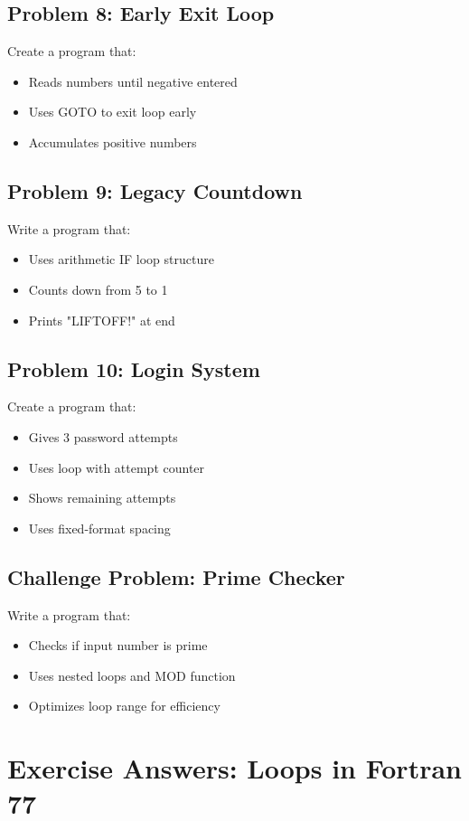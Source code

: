 \documentclass{book}
\begin{document}
\subsection*{Problem 8: Early Exit Loop}  
Create a program that:  
\begin{itemize}  
\item Reads numbers until negative entered  
\item Uses GOTO to exit loop early  
\item Accumulates positive numbers  
\end{itemize}

\subsection*{Problem 9: Legacy Countdown}  
Write a program that:  
\begin{itemize}  
\item Uses arithmetic IF loop structure  
\item Counts down from 5 to 1  
\item Prints "LIFTOFF!" at end  
\end{itemize}

\subsection*{Problem 10: Login System}  
Create a program that:  
\begin{itemize}  
\item Gives 3 password attempts  
\item Uses loop with attempt counter  
\item Shows remaining attempts  
\item Uses fixed-format spacing  
\end{itemize}

\subsection*{Challenge Problem: Prime Checker}  
Write a program that:  
\begin{itemize}  
\item Checks if input number is prime  
\item Uses nested loops and MOD function  
\item Optimizes loop range for efficiency  
\end{itemize}

\section{Exercise Answers: Loops in Fortran 77}
\end{document}

